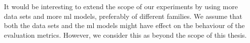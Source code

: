 \begin{conclusion}
It would be interesting to extend the scope of our experiments by using more data sets and more \acrshort{ml} models, preferably of different families.
We assume that both the data sets and the \acrshort{ml} models might have effect on the behaviour of the evaluation metrics.
However, we consider this as beyond the scope of this thesis.

\end{conclusion}
